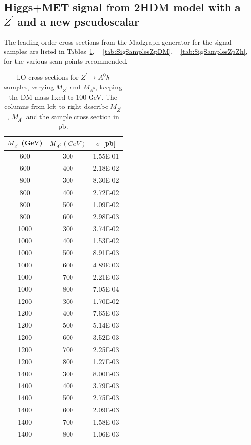 \subsection{Higgs+MET signal from 2HDM model with a $Z^\prime$ and a new pseudoscalar}
\label{subsec:Simulation}

The leading order cross-sections from the Madgraph generator for the signal samples are listed in Tables~\ref{tab:SigSamplesZpA0}, ~ \ref{tab:SigSamplesZpDM}, ~ \ref{tab:SigSamplesZpZh}, for the various scan points recommended.  

\begin{table}
	\centering
	\small
	\begin{tabular}{|c|c|c|}
		\hline
		$M_{Z^\prime}$ (GeV) & $M_{A^0}(GeV)$ & $\sigma$ [pb] \\ \hline \hline
		600 & 300 & 1.55E-01  \\
		600 & 400 & 2.18E-02  \\
		800 & 300 & 8.30E-02  \\
		800 & 400 & 2.72E-02  \\
		800 & 500 & 1.09E-02  \\
		800 & 600 & 2.98E-03  \\
		1000 & 300 & 3.74E-02  \\
		1000 & 400 & 1.53E-02  \\
		1000 & 500 & 8.91E-03  \\
		1000 & 600 & 4.89E-03  \\
		1000 & 700 & 2.21E-03  \\
		1000 & 800 & 7.05E-04  \\
		1200 & 300 & 1.70E-02  \\
		1200 & 400 & 7.65E-03  \\
		1200 & 500 & 5.14E-03  \\
		1200 & 600 & 3.52E-03  \\
		1200 & 700 & 2.25E-03  \\
		1200 & 800 & 1.27E-03  \\
		1400 & 300 & 8.00E-03  \\
		1400 & 400 & 3.79E-03  \\
		1400 & 500 & 2.75E-03  \\
		1400 & 600 & 2.09E-03  \\
		1400 & 700 & 1.58E-03  \\
		1400 & 800 & 1.06E-03  \\
		\hline
		\hline
	\end{tabular}
	\caption{LO cross-sections for $Z^\prime \to A^0h$ samples, varying $M_{Z^\prime}$ and $M_{A^0}$, keeping the DM mass fixed to 100 GeV. 
    The columns from left to right describe $M_{Z^\prime}$, $M_{A^0}$ and the sample cross section in pb.}
   \label{tab:SigSamplesZpA0}
\end{table}


